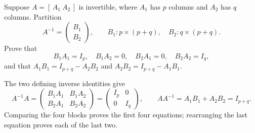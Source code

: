 \begin{problem}\label{ex:02:split-inverse}
Suppose $A=[\,A_1\ A_2\,]$ is invertible, where $A_1$ has $p$ columns
and $A_2$ has $q$ columns. Partition
\[
A^{-1}=\begin{pmatrix}B_1\\B_2\end{pmatrix},
\qquad B_1:p\times(p+q),\quad B_2:q\times(p+q).
\]
Prove that
\[
B_1A_1=I_p,\quad B_1A_2=0,\quad B_2A_1=0,\quad B_2A_2=I_q,
\]
and that $A_1B_1=I_{p+q}-A_2B_2$ and $A_2B_2=I_{p+q}-A_1B_1$.
\end{problem}
\begin{solution}
The two defining inverse identities give
\[
A^{-1}A=
\begin{pmatrix}B_1A_1&B_1A_2\\B_2A_1&B_2A_2\end{pmatrix}
=\begin{pmatrix}I_p&0\\0&I_q\end{pmatrix},
\qquad
AA^{-1}=A_1B_1+A_2B_2=I_{p+q}.
\]
Comparing the four blocks proves the first four equations;
rearranging the last equation proves each of the last two.
\end{solution}

